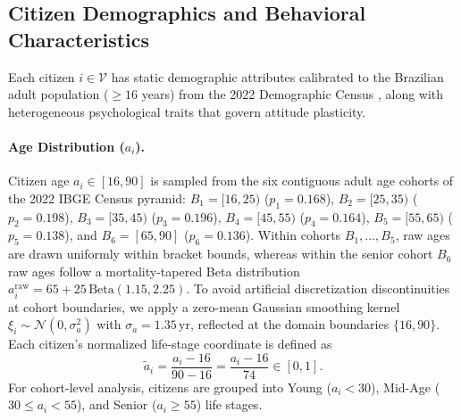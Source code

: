 \documentclass{article}
\begin{document}
\subsection{Citizen Demographics and Behavioral Characteristics}
\label{subsec:demographics_traits}

Each citizen $i \in \mathcal{V}$ has static demographic attributes calibrated to the Brazilian adult population ($\ge 16$ years) from the 2022 Demographic Census \citep{ibge2022censo}, along with heterogeneous psychological traits that govern attitude plasticity.

\paragraph{Age Distribution ($a_i$).}
Citizen age $a_i \in [16, 90]$ is sampled from the six contiguous adult age cohorts of the 2022 IBGE Census pyramid: $B_1 = [16, 25)$ ($p_1 = 0.168$), $B_2 = [25, 35)$ ($p_2 = 0.198$), $B_3 = [35, 45)$ ($p_3 = 0.196$), $B_4 = [45, 55)$ ($p_4 = 0.164$), $B_5 = [55, 65)$ ($p_5 = 0.138$), and $B_6 = [65, 90]$ ($p_6 = 0.136$). Within cohorts $B_1, \dots, B_5$, raw ages are drawn uniformly within bracket bounds, whereas within the senior cohort $B_6$ raw ages follow a mortality-tapered Beta distribution $a_i^{\mathrm{raw}} = 65 + 25\,\mathrm{Beta}(1.15, 2.25)$. To avoid artificial discretization discontinuities at cohort boundaries, we apply a zero-mean Gaussian smoothing kernel $\xi_i \sim \mathcal{N}(0, \sigma_a^2)$ with $\sigma_a = 1.35 \, \mathrm{yr}$, reflected at the domain boundaries $\{16, 90\}$. Each citizen's normalized life-stage coordinate is defined as
\begin{equation}
    \tilde{a}_i = \frac{a_i - 16}{90 - 16} = \frac{a_i - 16}{74} \in [0, 1].
    \label{eq:age_norm}
\end{equation}
For cohort-level analysis, citizens are grouped into Young ($a_i < 30$), Mid-Age ($30 \le a_i < 55$), and Senior ($a_i \ge 55$) life stages.
\end{document}
